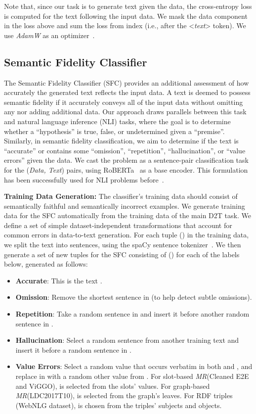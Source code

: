 \documentclass[11pt]{article}
\newcommand{\webnlg}{WebNLG\xspace}
\newcommand{\ldc}{LDC2017T10\xspace}
\newcommand{\viggo}{ViGGO\xspace}
\newcommand{\cleanedee}{Cleaned E2E\xspace}
\newcommand{\sfc}{SFC\xspace}
\newcommand{\mr}{\textit{MR}\xspace}
\theoremstyle{definition}
\theoremstyle{break}
\newcommand{\specialtoken}[1]{\mbox{\textless \textit{#1}\textgreater}}
\begin{document}
Note that, since our task is to generate text given the data, the cross-entropy loss is computed for the text following the input data. We mask the data component in the loss above and sum the loss from index  (i.e., after the \specialtoken{text} token). We use \textit{AdamW} as an optimizer~\cite{loshchilov2018decoupled}.



\subsection{Semantic Fidelity Classifier}
The Semantic Fidelity Classifier (\sfc) provides an additional assessment of how accurately the generated text reflects the input data.
A text is deemed to possess semantic fidelity if it accurately conveys all of the input data without omitting any nor adding additional data. Our approach draws parallels between this task and natural language inference (NLI) tasks, where the goal is to determine whether a ``hypothesis'' is true, false, or undetermined given a ``premise''. Similarly, in semantic fidelity classification, we aim to determine if the text is ``accurate'' or contains some ``omission'', ``repetition'', ``hallucination'', or ``value errors'' given the data. 
We cast the problem as a sentence-pair classification task for the (\textit{Data, Text}) pairs, using RoBERTa~\cite{liu2019roberta} as a base encoder. This formulation has been successfully used for NLI problems before~\cite{devlin-etal-2019-bert}.


\textbf{Training Data Generation:}
The classifier's training data should consist of semantically faithful and semantically incorrect examples. We generate training data for the \sfc automatically from the training data of the main D2T task. We define a set of simple dataset-independent transformations that account for common errors in data-to-text generation. 
For each tuple ({}) in the training data, we split the text  into sentences, using the spaCy sentence tokenizer~\cite{spacy2}. We then generate a set of new tuples for the \sfc consisting of () for each of the labels  below, generated as follows:

\begin{itemize}
    \item \textbf{Accurate}: This is the text .
    \item \textbf{Omission}: Remove the shortest sentence in  (to help detect subtle omissions). 
    \item \textbf{Repetition}: Take a random sentence in  and insert it before another random sentence in . 
    \item \textbf{Hallucination}: Select a random sentence from another training text  and insert it before a random sentence in .
    \item \textbf{Value Errors}: Select a random value  that occurs verbatim in both  and , and replace  in  with a random other value from . 
    For slot-based \mr (\cleanedee and \viggo),  is selected from the slots' values. For graph-based \mr (\ldc),  is selected from the graph's leaves. For RDF triples (\webnlg dataset),  is chosen from the triples' subjects and objects. 
\end{itemize}
\end{document}
